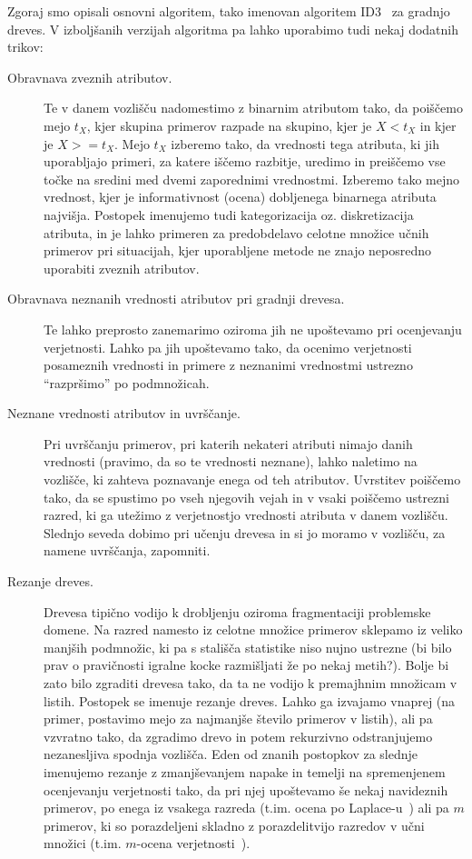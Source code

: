 Zgoraj smo opisali osnovni algoritem, tako imenovan algoritem ID3~\cite{} za gradnjo dreves. V izboljšanih verzijah algoritma pa lahko uporabimo tudi nekaj dodatnih trikov:
%
\begin{description}
\item[Obravnava zveznih atributov.] Te v danem vozlišču nadomestimo z binarnim atributom tako, da poiščemo mejo $t_X$, kjer skupina primerov razpade na skupino, kjer je $X<t_X$ in kjer je $X>=t_X$. Mejo $t_X$ izberemo tako, da vrednosti tega atributa, ki jih uporabljajo primeri, za katere iščemo razbitje, uredimo in preiščemo vse točke na sredini med dvemi zaporednimi vrednostmi. Izberemo tako mejno vrednost, kjer je informativnost (ocena) dobljenega binarnega atributa najvišja. Postopek imenujemo tudi kategorizacija oz. diskretizacija atributa, in je lahko primeren za predobdelavo celotne množice učnih primerov pri situacijah, kjer uporabljene metode ne znajo neposredno uporabiti zveznih atributov.

\item[Obravnava neznanih vrednosti atributov pri gradnji drevesa.] Te lahko preprosto zanemarimo oziroma jih ne upoštevamo pri ocenjevanju verjetnosti. Lahko pa jih upoštevamo tako, da ocenimo verjetnosti posameznih vrednosti in primere z neznanimi vrednostmi ustrezno ``razpršimo'' po podmnožicah.

\item[Neznane vrednosti atributov in uvrščanje.] Pri uvrščanju primerov, pri katerih nekateri atributi nimajo danih vrednosti (pravimo, da so te vrednosti neznane), lahko naletimo na vozlišče, ki zahteva poznavanje enega od teh atributov. Uvrstitev poiščemo tako, da se spustimo po vseh njegovih vejah in v vsaki poiščemo ustrezni razred, ki ga utežimo z verjetnostjo vrednosti atributa v danem vozlišču. Slednjo seveda dobimo pri učenju drevesa in si jo moramo v vozlišču, za namene uvrščanja, zapomniti.

\item[Rezanje dreves.] Drevesa tipično vodijo k drobljenju oziroma fragmentaciji problemske domene. Na razred namesto iz celotne množice primerov sklepamo iz veliko manjših podmnožic, ki pa s stališča statistike niso nujno ustrezne (bi bilo prav o pravičnosti igralne kocke razmišljati že po nekaj metih?). Bolje bi zato bilo zgraditi drevesa tako, da ta ne vodijo k premajhnim množicam v listih. Postopek se imenuje rezanje dreves. Lahko ga izvajamo vnaprej (na primer, postavimo mejo za najmanjše število primerov v listih), ali pa vzvratno tako, da zgradimo drevo in potem rekurzivno odstranjujemo nezanesljiva spodnja vozlišča. Eden od znanih postopkov za slednje imenujemo rezanje z zmanjševanjem napake  in temelji na spremenjenem ocenjevanju verjetnosti tako, da pri njej upoštevamo še nekaj navideznih primerov, po enega iz vsakega razreda (t.im. ocena po Laplace-u~\cite{}) ali pa $m$ primerov, ki so porazdeljeni skladno z porazdelitvijo razredov v učni množici (t.im. $m$-ocena verjetnosti~\cite{}).


\end{description}
